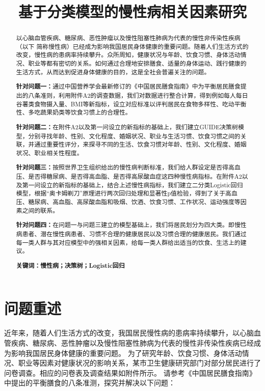 \documentclass{article}
\date{}
\title{\heiti 基于分类模型的慢性病相关因素研究}
\numberwithin{equation}{subsection}
\begin{document}
\maketitle

\vspace{-5em}%
\begin{abstract}
以心脑血管疾病、糖尿病、恶性肿瘤以及慢性阻塞性肺病为代表的慢性非传染性疾病（以下
简称慢性病）已经成为影响我国居民身体健康的重要问题。随着人们生活方式的改变，慢性病的患病率持续攀升。众所周知，健康状况与年龄、饮食习惯、身体活动情况、职业等都有密切的关系。如何通过合理地安排膳食、适量的身体运动、践行健康的生活方式，从而达到促进身体健康的目的，这是全社会普遍关注的问题。

\textbf{针对问题一：}通过中国营养学会最新修订的《中国居民膳食指南》中为平衡居民膳食提出的八条准则，利用附件A2的调查数据，我们对数据进行整合计算，得到例如每人每日谷薯类食物摄入量、BMI等新指标，设立对应标准以评判居民在食物多样性、吃动平衡性、多吃蔬果奶类等饮食习惯上的合理性。

\textbf{针对问题二：}在附件A2以及第一问设立的新指标的基础上，我们建立GUIDE决策树模型，分别寻找年龄、性别、文化程度、婚姻状况、职业与生活习惯、饮食习惯之间的关联，并通过重要性评分，来探寻不同的生活、饮食习惯对年龄、性别、文化程度、婚姻状况、职业相关性程度。

\textbf{针对问题三：}按照世界卫生组织给出的慢性病判断标准，我们给人群设定是否得高血压、是否得糖尿病、是否得高血脂、是否得高尿酸血症这四种慢性病指标。在附件A2以及第一问设立的新指标的基础上，结合上述慢性病指标，我们建立二分类Logistic回归模型，根据“奥卡姆剃刀”原理进行两次回归处理和显著性p值检验，得到了关于高血压、糖尿病、高血脂、高尿酸血脂和吸烟、饮酒、饮食习惯、工作状况、运动强度等因素之间的联系。

\textbf{针对问题四：}在问题一与问题三建立的模型基础上，我们将居民划分为四大类。即慢性病患者、潜在慢性病患者、习惯不合理的健康居民以及习惯合理的健康居民。我们通过每一类人群与其对应模型中的强相关因素，给每一类人群给出适当的饮食、生活上的建议。

\textbf{关键词：慢性病；决策树；Logistic回归}
\end{abstract}
\newpage

{\centering\section{问题重述}}
近年来，随着人们生活方式的改变，我国居民慢性病的患病率持续攀升，以心脑血管疾病、糖尿病、恶性肿瘤以及慢性阻塞性肺病为代表的慢性非传染性疾病已经成为影响我国居民身体健康的重要问题。
为了研究年龄、饮食习惯、身体活动情况、职业等因素对健康状况的影响关系，某市卫生健康研究部门对部分居民进行了问卷调查。相应的问卷表及调查结果如附件所示。
请参考《中国居民膳食指南》中提出的平衡膳食的八条准测，探究并解决以下问题：
\end{document}
